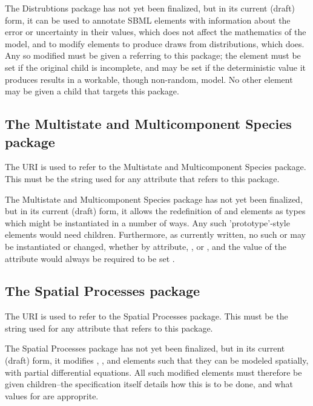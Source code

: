The Distrubtions package has not yet been finalized, but in its current (draft) form, it can be used to annotate SBML elements with information about the error or uncertainty in their values, which does not affect the mathematics of the model, and to modify \FunctionDefinition elements to produce draws from distributions, which does.  Any \FunctionDefinition so modified must be given a \ChangedMath referring to this package; the  element must be set  if the original \Math child is incomplete, and may be set  if the deterministic value it produces results in a workable, though non-random, model.  No other element may be given a \ChangedMath child that targets this package.


\subsection{The Multistate and Multicomponent Species package}

The URI  is used to refer to the Multistate and Multicomponent Species package.  This must be the string used for any  attribute that refers to this package.

The Multistate and Multicomponent Species package has not yet been finalized, but in its current (draft) form, it allows the redefinition of \Species and \Compartment elements as types which might be instantiated in a number of ways.  Any such 'prototype'-style elements would need \ChangedMath children.  Furthermore, as currently written, no such \Species or \Compartment may be instantiated or changed, whether by attribute, \InitialAssignment, or \Rule, and the value of the  attribute would always be required to be set .


\subsection{The Spatial Processes package}

The URI  is used to refer to the Spatial Processes package.  This must be the string used for any  attribute that refers to this package.

The Spatial Processes package has not yet been finalized, but in its current (draft) form, it modifies \Species, \Compartment, and \Reaction elements such that they can be modeled spatially, with partial differential equations.  All such modified elements must therefore be given \ChangedMath children--the specification itself details how this is to be done, and what values for  are approprite.


